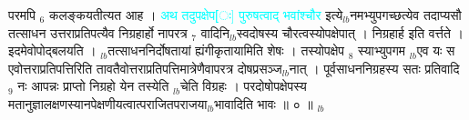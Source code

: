 \documentclass[article,12pt,a4paper]{memoir}%
\newcommand{\quotelemma}[1]{\textcolor{cyan}{#1}}
\newcounter{parCount}
\begin{document}
परमपि {\tiny $_{6}$} कलङ्कयतीत्यत आह । \quotelemma{अथ तदुपक्षेप[ः] पुरुषत्वाद् भवांश्चौर} इत्ये{\tiny $_{lb}$}नमभ्युपगच्छत्येव तदाप्यसौ तत्साधन उत्तराप्रतिपत्यैव निग्रहार्हो नापरत्र {\tiny $_{7}$} वादिनि{\tiny $_{lb}$}स्वदोषस्य चौरत्वस्योपक्षेपात् । निग्रहार्ह इति वर्त्तते । इदमेवोपोद्बलयति । {\tiny $_{lb}$}तत्साधननिर्दोषतायां \cite[18b8]{vn-msN} ह्यंगीकृतायामिति शेषः । तस्योपक्षेप {\tiny $_{8}$} स्याभ्युपगम {\tiny $_{lb}$}एव यः स एवोत्तराप्रतिपत्तिरिति तावतैवोत्तराप्रतिपत्तिमात्रेणैवापरत्र दोषप्रसञ्ज{\tiny $_{lb}$}नात् । पूर्वसाधननिग्रहस्य सतः प्रतिवादि {\tiny $_{9}$} \leavevmode{} नः आपन्नः प्राप्तो निग्रहो येन तस्येति {\tiny $_{lb}$}चेति विग्रहः । परदोषोपक्षेपस्य मतानुज्ञालक्षणस्यानपेक्षणीयत्वात्पराजितपराजया{\tiny $_{lb}$}भावादिति भावः ॥ ० ॥
	{}
	\pend%
      {\tiny $_{lb}$}
\end{document}
